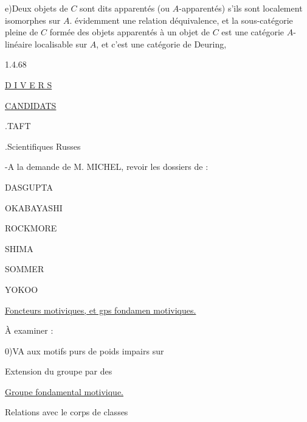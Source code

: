 e)\quad Deux objets de $C$ sont dits apparentés (ou $A$-apparentés) s'ils sont localement isomorphes sur $A$.  évidemment une relation déquivalence, et la sous-catégorie pleine de $C$ formée des objets apparentés à un objet de $C$ est une catégorie  $A$-linéaire localisable sur $A$, et c'est une catégorie de Deuring,

\begin{flushright}1.4.68\end{flushright}

\uline{D I V E R S}

\uline{CANDIDATS}

.\quad TAFT

.\quad Scientifiques Russes

-\quad A la demande de M. MICHEL, revoir les dossiers de :

DASGUPTA

OKABAYASHI

ROCKMORE

SHIMA

SOMMER

YOKOO


\uline{Foncteurs  motiviques, et gps fondamen motiviques.}

À examiner :

0)\quad VA
 aux motifs purs de poids impairs sur

Extension du groupe  par des 

\uline{Groupe fondamental motivique.}

Relations avec le corps de classes

